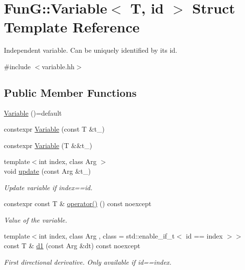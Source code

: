 \hypertarget{structFunG_1_1Variable}{\section{Fun\-G\-:\-:Variable$<$ T, id $>$ Struct Template Reference}
\label{structFunG_1_1Variable}
}


Independent variable. Can be uniquely identified by its id.  




{\ttfamily \#include $<$variable.\-hh$>$}

\subsection*{Public Member Functions}
\begin{DoxyCompactItemize}
\item 
\hyperlink{structFunG_1_1Variable_a20d207e651ee9e93c86dfa4ea1053f56}{Variable} ()=default
\item 
constexpr \hyperlink{structFunG_1_1Variable_af77daee887434f3fe1902bdfcb2639a0}{Variable} (const T \&t\-\_\-)
\item 
constexpr \hyperlink{structFunG_1_1Variable_ac3e65c76a69913a23d53c84ce01e602a}{Variable} (T \&\&t\-\_\-)
\item 
{\footnotesize template$<$int index, class Arg $>$ }\\void \hyperlink{structFunG_1_1Variable_a50f4d34586aa6a89df604503e0a3c2a9}{update} (const Arg \&t\-\_\-)
\begin{DoxyCompactList}\small\item\em Update variable if index==id. \end{DoxyCompactList}\item 
constexpr const T \& \hyperlink{structFunG_1_1Variable_afc527158ee42ca6f9a91a465d077fb65}{operator()} () const noexcept
\begin{DoxyCompactList}\small\item\em Value of the variable. \end{DoxyCompactList}\item 
{\footnotesize template$<$int index, class Arg , class  = std\-::enable\-\_\-if\-\_\-t$<$ id == index $>$$>$ }\\const T \& \hyperlink{structFunG_1_1Variable_a9384160b4015767ffe6a058583fef10a}{d1} (const Arg \&dt) const noexcept
\begin{DoxyCompactList}\small\item\em First directional derivative. Only available if id==index. \end{DoxyCompactList}\end{DoxyCompactItemize}


